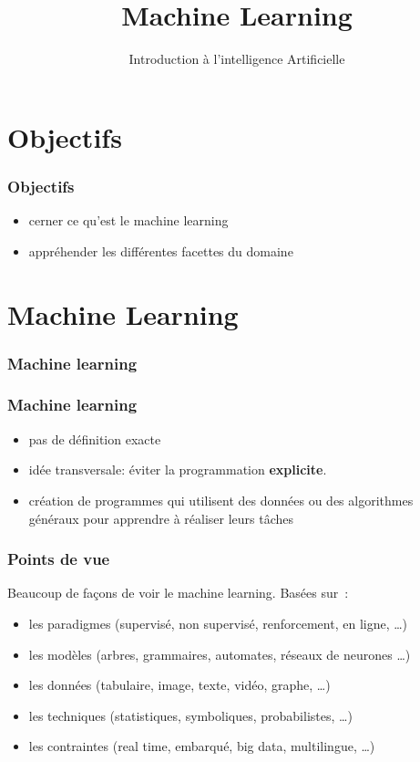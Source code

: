 \documentclass{formation}
\title{Machine Learning}
\subtitle{Introduction à l'intelligence Artificielle}
\begin{document}
\maketitle

\section{Objectifs}

\begin{frame}
  \frametitle{Objectifs}
  \begin{itemize}
  \item cerner ce qu'est le machine learning
  \item appréhender les différentes facettes du domaine
  \end{itemize}
\end{frame}

\section{Machine Learning}

\begin{frame}
  \frametitle{Machine learning}

\end{frame}

\begin{frame}
  \frametitle{Machine learning}
  \begin{itemize}
  \item pas de définition exacte
  \item idée transversale: éviter la programmation \textbf{explicite}.
  \item création de programmes qui utilisent des données ou des
    algorithmes généraux pour apprendre à réaliser leurs tâches
  \end{itemize}
\end{frame}

\begin{frame}
  \frametitle{Points de vue}
  Beaucoup de façons de voir le machine learning. Basées sur :
  \begin{itemize}[<+->]
  \item les paradigmes (supervisé, non supervisé, renforcement, en
    ligne, …)
  \item les modèles (arbres, grammaires, automates, réseaux de
    neurones …)
  \item les données (tabulaire, image, texte, vidéo, graphe, …)
  \item les techniques (statistiques, symboliques, probabilistes, …)
  \item les contraintes (real time, embarqué, big data, multilingue,
    …)
  \end{itemize}

\end{frame}
\end{document}
